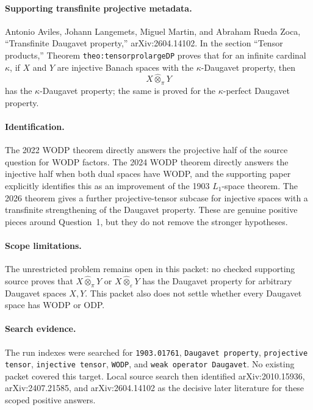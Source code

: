 \documentclass[11pt]{article}
\begin{document}
\paragraph{Supporting transfinite projective metadata.}
Antonio Aviles, Johann Langemets, Miguel Martin, and Abraham Rueda Zoca,
``Transfinite Daugavet property,'' arXiv:2604.14102. In the section
``Tensor products,'' Theorem \texttt{theo:tensorprolargeDP} proves that for an
infinite cardinal \(\kappa\), if \(X\) and \(Y\) are injective Banach spaces
with the \(\kappa\)-Daugavet property, then
\[
  X\widehat{\otimes}_{\pi}Y
\]
has the \(\kappa\)-Daugavet property; the same is proved for the
\(\kappa\)-perfect Daugavet property.

\paragraph{Identification.}
The 2022 WODP theorem directly answers the projective half of the source
question for WODP factors. The 2024 WODP theorem directly answers the
injective half when both dual spaces have WODP, and the supporting paper
explicitly identifies this as an improvement of the 1903 \(L_1\)-space theorem.
The 2026 theorem gives a further projective-tensor subcase for injective spaces
with a transfinite strengthening of the Daugavet property. These are genuine
positive pieces around Question~1, but they do not remove the stronger
hypotheses.

\paragraph{Scope limitations.}
The unrestricted problem remains open in this packet: no checked supporting
source proves that \(X\widehat{\otimes}_{\pi}Y\) or
\(X\widehat{\otimes}_{\varepsilon}Y\) has the Daugavet property for arbitrary
Daugavet spaces \(X,Y\). This packet also does not settle whether every
Daugavet space has WODP or ODP.

\paragraph{Search evidence.}
The run indexes were searched for \texttt{1903.01761},
\texttt{Daugavet property}, \texttt{projective tensor},
\texttt{injective tensor}, \texttt{WODP}, and
\texttt{weak operator Daugavet}. No existing packet covered this target. Local
source search then identified arXiv:2010.15936, arXiv:2407.21585, and
arXiv:2604.14102 as the decisive later literature for these scoped positive
answers.
\end{document}
